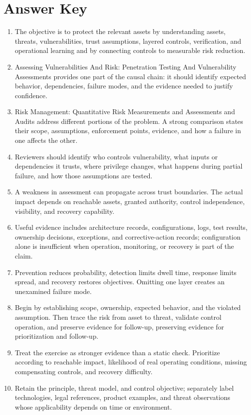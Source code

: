 \documentclass[11pt]{article}
\begin{document}
\section*{Answer Key}
\begin{enumerate}
\item The objective is to protect the relevant assets by understanding assets, threats, vulnerabilities, trust assumptions, layered controls, verification, and operational learning and by connecting controls to measurable risk reduction.
\item Assessing Vulnerabilities And Risk: Penetration Testing And Vulnerability Assessments provides one part of the causal chain: it should identify expected behavior, dependencies, failure modes, and the evidence needed to justify confidence.
\item Risk Management: Quantitative Risk Measurements and Assessments and Audits address different portions of the problem. A strong comparison states their scope, assumptions, enforcement points, evidence, and how a failure in one affects the other.
\item Reviewers should identify who controls vulnerability, what inputs or dependencies it trusts, where privilege changes, what happens during partial failure, and how those assumptions are tested.
\item A weakness in assessment can propagate across trust boundaries. The actual impact depends on reachable assets, granted authority, control independence, visibility, and recovery capability.
\item Useful evidence includes architecture records, configurations, logs, test results, ownership decisions, exceptions, and corrective-action records; configuration alone is insufficient when operation, monitoring, or recovery is part of the claim.
\item Prevention reduces probability, detection limits dwell time, response limits spread, and recovery restores objectives. Omitting one layer creates an unexamined failure mode.
\item Begin by establishing scope, ownership, expected behavior, and the violated assumption. Then trace the risk from asset to threat, validate control operation, and preserve evidence for follow-up, preserving evidence for prioritization and follow-up.
\item Treat the exercise as stronger evidence than a static check. Prioritize according to reachable impact, likelihood of real operating conditions, missing compensating controls, and recovery difficulty.
\item Retain the principle, threat model, and control objective; separately label technologies, legal references, product examples, and threat observations whose applicability depends on time or environment.
\end{enumerate}
\end{document}
